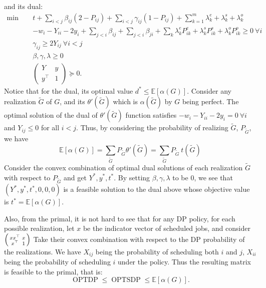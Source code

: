 \documentclass{article}
\newcommand{\E}{\mathbb{E}}
\begin{document}
and its dual:
\begin{align*}
    \min\quad~& t+\sum_{i<j}\beta_{ij}(2-P_{ij})+\sum_{i<j}\gamma_{ij}(1-P_{ij})+\sum_{k=1}^{m}\lambda_{k}^e+\lambda_{k}^s+\lambda_{k}^o\\
    &-w_i-Y_{ii}-2y_i+\sum_{j<i}\beta_{ij}+\sum_{j<i}\beta_{ji}+\sum_{k}\lambda_{k}^e P_{ik}^e+\lambda_k^s P_{ik}^s+\lambda_k^o P_{ik}^o\geq 0~\forall i\\
    &\gamma_{ij}\geq 2Y_{ij}~\forall i<j\\
    &\beta,\gamma,\lambda\geq 0\\
    &\begin{pmatrix}
        Y&y\\
        y^\top &1
    \end{pmatrix}\succeq 0.
\end{align*}
Notice that for the dual, its optimal value $d^*\leq \E[\alpha(G)]$.
Consider any realization $\tilde{G}$ of $G$, and its $\theta'(\tilde{G})$ which is $\alpha(\tilde{G})$ by $G$ being perfect.
The optimal solution of the dual of $\theta'(\tilde{G})$ function satisfies $-w_i-Y_{ii}-2y_i = 0~\forall i$ and $Y_{ij}\leq 0$ for all $i<j$.
Thus, by considering the probability of realizing $\tilde{G}$, $P_{\tilde{G}}$, we have
\[\E[\alpha(G)] = \sum_{\tilde{G}}P_{\tilde{G}}\theta'(\tilde{G})=\sum_{\tilde{G}}P_{\tilde{G}}~t(\tilde{G})\]
Consider the convex combination of optimal dual solutions of each realization $\tilde{G}$ with respect to $P_{\tilde{G}}$ and get $Y^*,y^*,t^*$.
By setting $\beta,\gamma,\lambda$ to be $0$, we see that $(Y^*,y^*,t^*,0,0,0)$ is a feasible solution to the dual above whose objective value is $t^*=\E[\alpha(G)]$.

Also, from the primal, it is not hard to see that for any DP policy, for each possible realization, let $x$ be the indicator vector of scheduled jobs, and consider $\begin{psmallmatrix} xx^\top &x\\x^\top &1
\end{psmallmatrix}$
Take their convex combination with respect to the DP probability of the realizations.
We have $X_{ij}$ being the probability of scheduling both $i$ and $j$, $X_{ii}$ being the probability of scheduling $i$ under the policy. 
Thus the resulting matrix is feasible to the primal, that is:
\[\operatorname{OPTDP}\leq \operatorname{OPTSDP}\leq \E[\alpha(G)].\]
\end{document}
